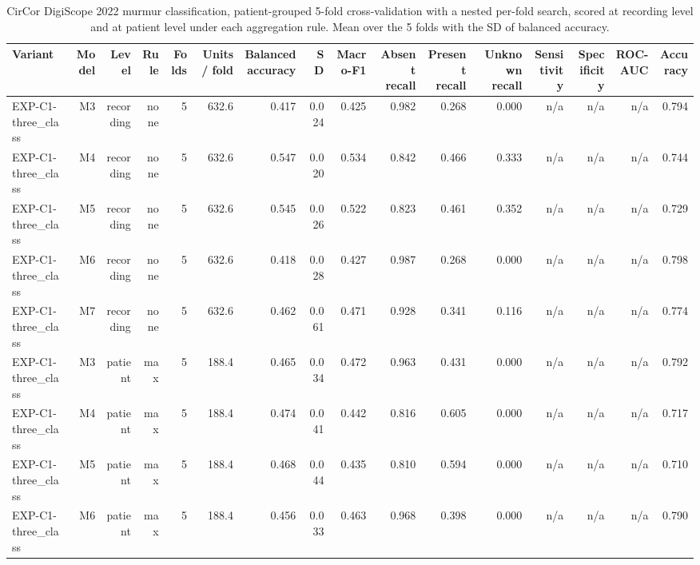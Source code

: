 \begin{table}[htbp]
  \centering
  \caption{CirCor DigiScope 2022 murmur classification, patient-grouped 5-fold cross-validation with a nested per-fold search, scored at recording level and at patient level under each aggregation rule. Mean over the 5 folds with the SD of balanced accuracy.}
  \label{tab:t13}
  \begin{tabular}{lrrrrrrrrrrrrrrr}
    \toprule
    Variant & Model & Level & Rule & Folds & Units / fold & Balanced accuracy & SD & Macro-F1 & Absent recall & Present recall & Unknown recall & Sensitivity & Specificity & ROC-AUC & Accuracy \\
    \midrule
    EXP-C1-three\_class & M3 & recording & none & 5 & 632.6 & 0.417 & 0.024 & 0.425 & 0.982 & 0.268 & 0.000 & n/a & n/a & n/a & 0.794 \\
    EXP-C1-three\_class & M4 & recording & none & 5 & 632.6 & 0.547 & 0.020 & 0.534 & 0.842 & 0.466 & 0.333 & n/a & n/a & n/a & 0.744 \\
    EXP-C1-three\_class & M5 & recording & none & 5 & 632.6 & 0.545 & 0.026 & 0.522 & 0.823 & 0.461 & 0.352 & n/a & n/a & n/a & 0.729 \\
    EXP-C1-three\_class & M6 & recording & none & 5 & 632.6 & 0.418 & 0.028 & 0.427 & 0.987 & 0.268 & 0.000 & n/a & n/a & n/a & 0.798 \\
    EXP-C1-three\_class & M7 & recording & none & 5 & 632.6 & 0.462 & 0.061 & 0.471 & 0.928 & 0.341 & 0.116 & n/a & n/a & n/a & 0.774 \\
    EXP-C1-three\_class & M3 & patient & max & 5 & 188.4 & 0.465 & 0.034 & 0.472 & 0.963 & 0.431 & 0.000 & n/a & n/a & n/a & 0.792 \\
    EXP-C1-three\_class & M4 & patient & max & 5 & 188.4 & 0.474 & 0.041 & 0.442 & 0.816 & 0.605 & 0.000 & n/a & n/a & n/a & 0.717 \\
    EXP-C1-three\_class & M5 & patient & max & 5 & 188.4 & 0.468 & 0.044 & 0.435 & 0.810 & 0.594 & 0.000 & n/a & n/a & n/a & 0.710 \\
    EXP-C1-three\_class & M6 & patient & max & 5 & 188.4 & 0.456 & 0.033 & 0.463 & 0.968 & 0.398 & 0.000 & n/a & n/a & n/a & 0.790 \\

\end{tabular}
\end{table}
